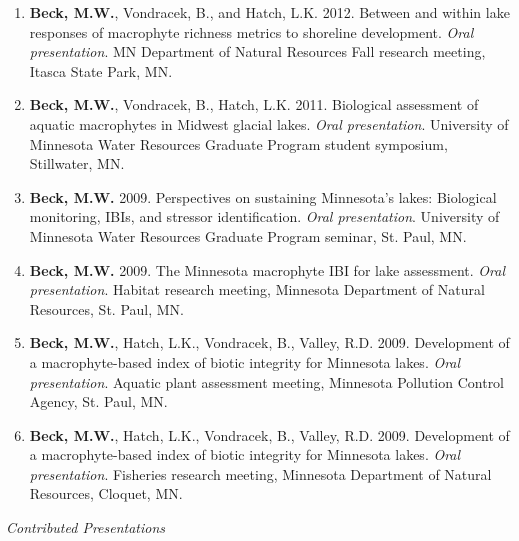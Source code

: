 \documentclass[letterpaper,12pt]{article}
\begin{document}
\begin{enumerate}
\item {\bf Beck, M.W.}, Vondracek, B., and Hatch, L.K. 2012. Between and within lake responses of macrophyte richness metrics to shoreline development. \textit{Oral presentation}. MN Department of Natural Resources Fall research meeting, Itasca State Park, MN.

\item {\bf Beck, M.W.}, Vondracek, B., Hatch, L.K. 2011. Biological assessment of aquatic macrophytes in Midwest glacial lakes. \textit{Oral presentation}. University of Minnesota Water Resources Graduate Program student symposium, Stillwater, MN.

\item {\bf Beck, M.W.} 2009. Perspectives on sustaining Minnesota's lakes: Biological monitoring, IBIs, and stressor identification. \textit{Oral presentation}. University of Minnesota Water Resources Graduate Program seminar, St. Paul, MN.

\item {\bf Beck, M.W.} 2009. The Minnesota macrophyte IBI for lake assessment. \textit{Oral presentation}. Habitat research meeting, Minnesota Department of Natural Resources, St. Paul, MN.

\item {\bf Beck, M.W.}, Hatch, L.K., Vondracek, B., Valley, R.D. 2009. Development of a macrophyte-based index of biotic integrity for Minnesota lakes. \textit{Oral presentation}. Aquatic plant assessment meeting, Minnesota Pollution Control Agency, St. Paul, MN.

\item {\bf Beck, M.W.}, Hatch, L.K., Vondracek, B., Valley, R.D. 2009. Development of a macrophyte-based index of biotic integrity for Minnesota lakes. \textit{Oral presentation}. Fisheries research meeting, Minnesota Department of Natural Resources, Cloquet, MN.

\end{enumerate}

\vspace{\baselineskip} 
\centerline{\large{\textit{Contributed Presentations}}}
\end{document}
